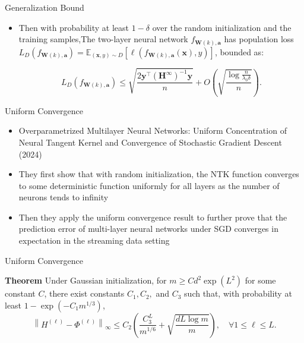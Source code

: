 \documentclass[serif, aspectratio=169]{beamer}
\begin{document}
\begin{frame}{Generalization Bound}
	
	
	\begin{itemize}
	\item Then with probability at least  \(1-\delta\) over the random initialization and the training
	samples,The two-layer neural network \(f_{\mathbf{W}(k), \mathbf{a}}\) has population loss \( L_D(f_{\mathbf{W}(k), \mathbf{a}}) = \mathbb{E}_{(\mathbf{x},y)\sim D}[\ell(f_{\mathbf{W}(k), \mathbf{a}}(\mathbf{x}),y)] \), bounded as: 
	
		
		\[
		L_D(f_{\mathbf{W}(k), \mathbf{a}}) \leq \sqrt{\frac{2 \mathbf{y}^\top (\mathbf{H}^\infty)^{-1} \mathbf{y}}{n}} + O\left( \sqrt{\frac{\log \frac{n}{\lambda_0 \delta}}{n}} \right).
		\]
		
	\end{itemize}
	
\end{frame}


\begin{frame}{Uniform Convergence}
	\begin{itemize}
		
\item Overparametrized Multilayer Neural Networks: Uniform Concentration of Neural Tangent Kernel and Convergence of Stochastic Gradient Descent (2024)
\item They first show that with random initialization, the NTK function converges to some
deterministic function uniformly for all layers as the number of neurons tends to infinity
\item Then they apply the uniform convergence result to further prove that the prediction error of multi-layer neural networks under SGD converges in expectation in the streaming data setting
	\end{itemize}

\end{frame}


\begin{frame}{Uniform Convergence}

\textbf{Theorem} Under Gaussian initialization, for \( m \geq C d^2 \exp(L^2) \) for some constant \( C \), there exist constants \( C_1, C_2, \) and \( C_3 \) such that, with probability at least \( 1 - \exp(-C_1 m^{1/3}) \),
\[
\left\| H^{(\ell)} - \Phi^{(\ell)} \right\|_{\infty} \leq C_2 \left( \frac{C_3^L}{m^{1/6}} + \sqrt{\frac{d L \log m}{m}} \right), \quad \forall 1 \leq \ell \leq L.
\]

	
\end{frame}
\end{document}
